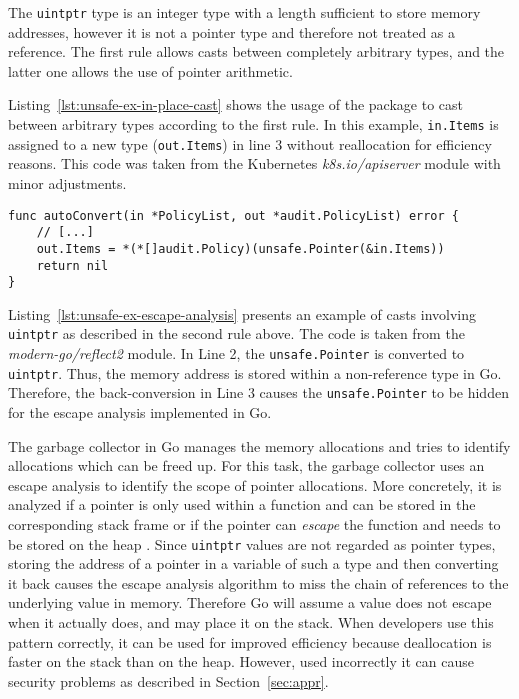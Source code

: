 The \texttt{uintptr} type is an integer type with a length sufficient to store memory addresses, however it is not a pointer type and therefore not treated as a reference.
The first \unsafe{} rule allows casts between completely arbitrary types, and the latter one allows the use of pointer arithmetic.

Listing~\ref{lst:unsafe-ex-in-place-cast} shows the usage of the \unsafe{} package to cast between arbitrary types according to the first rule. 
In this example, \texttt{in.Items} is assigned to a new type (\texttt{out.Items}) in line 3 without reallocation for efficiency reasons. 
This code was taken from the Kubernetes \textit{k8s.io/apiserver} module with minor adjustments.

\begin{lstlisting}[language=Golang, label=lst:unsafe-ex-in-place-cast, caption=In-place cast using the \unsafe{} package, float, belowskip=-1.5em]
func autoConvert(in *PolicyList, out *audit.PolicyList) error {
	// [...]
	out.Items = *(*[]audit.Policy)(unsafe.Pointer(&in.Items))
	return nil
}
\end{lstlisting}


Listing~\ref{lst:unsafe-ex-escape-analysis} presents an example of casts involving \texttt{uintptr} as described in the second rule above. 
The code is taken from the \textit{modern-go/reflect2} module.
In Line 2, the \texttt{unsafe.Pointer} is converted to \texttt{uintptr}.
Thus, the memory address is stored within a non-reference type in Go.
Therefore, the back-conversion in Line 3 causes the \texttt{unsafe.Pointer} to be hidden for the escape analysis implemented in Go. 

The garbage collector in Go manages the memory allocations and tries to identify allocations which can be freed up.
For this task, the garbage collector uses an escape analysis to identify the scope of pointer allocations. 
More concretely, it is analyzed if a pointer is only used within a function and can be stored in the corresponding stack frame or if the pointer can \textit{escape} the function and needs to be stored on the heap \cite{wang2020}. 
Since \texttt{uintptr} values are not regarded as pointer types, storing the address of a pointer in a variable of such a type and then converting it back causes the escape analysis algorithm to miss the chain of references to the underlying value in memory. 
Therefore Go will assume a value does not escape when it actually does, and may place it on the stack.
When developers use this pattern correctly, it can be used for improved efficiency because deallocation is faster on the stack than on the heap.
However, used incorrectly it can cause security problems as described in Section~\ref{sec:appr}.



